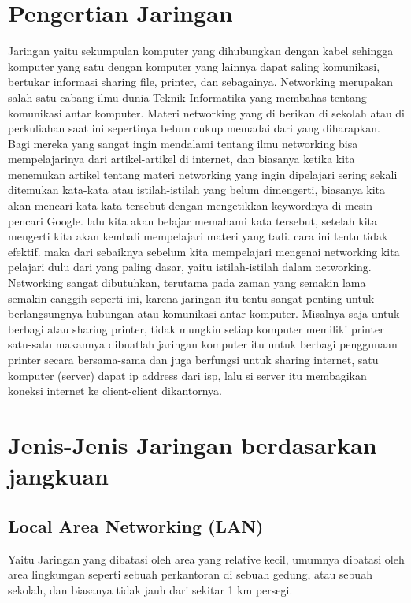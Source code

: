\section{Pengertian Jaringan}
  Jaringan yaitu sekumpulan komputer yang dihubungkan dengan kabel sehingga komputer yang satu dengan komputer yang lainnya dapat saling komunikasi, bertukar informasi sharing file, printer, dan sebagainya.
  Networking merupakan salah satu cabang ilmu dunia Teknik Informatika yang membahas tentang komunikasi antar komputer. Materi networking yang di berikan di sekolah atau di perkuliahan saat ini sepertinya belum cukup memadai dari yang diharapkan. Bagi mereka yang sangat ingin mendalami tentang ilmu networking bisa mempelajarinya dari artikel-artikel di internet, dan biasanya ketika kita menemukan artikel tentang materi networking yang ingin dipelajari sering sekali ditemukan kata-kata atau istilah-istilah yang belum dimengerti, biasanya kita akan mencari kata-kata tersebut dengan mengetikkan keywordnya di mesin pencari Google. lalu kita akan belajar memahami kata tersebut, setelah kita mengerti kita akan kembali mempelajari materi yang tadi. cara ini tentu tidak efektif. maka dari sebaiknya sebelum kita mempelajari mengenai networking kita pelajari dulu dari yang paling dasar, yaitu istilah-istilah dalam networking.
  Networking sangat dibutuhkan, terutama pada zaman yang semakin lama semakin canggih seperti ini, karena jaringan itu tentu sangat penting untuk berlangsungnya hubungan atau komunikasi antar komputer. Misalnya saja untuk berbagi atau sharing printer, tidak mungkin setiap komputer memiliki printer satu-satu makannya dibuatlah jaringan komputer itu untuk berbagi penggunaan printer secara bersama-sama dan juga berfungsi untuk sharing internet, satu komputer (server) dapat ip address dari isp, lalu si server itu membagikan koneksi internet ke client-client dikantornya.

\section{Jenis-Jenis Jaringan berdasarkan jangkuan}
  \subsection{Local Area Networking (LAN)}
    Yaitu Jaringan yang dibatasi oleh area yang relative kecil, umumnya dibatasi oleh area lingkungan seperti sebuah perkantoran di sebuah gedung, atau sebuah sekolah, dan biasanya tidak jauh dari sekitar 1 km persegi.
